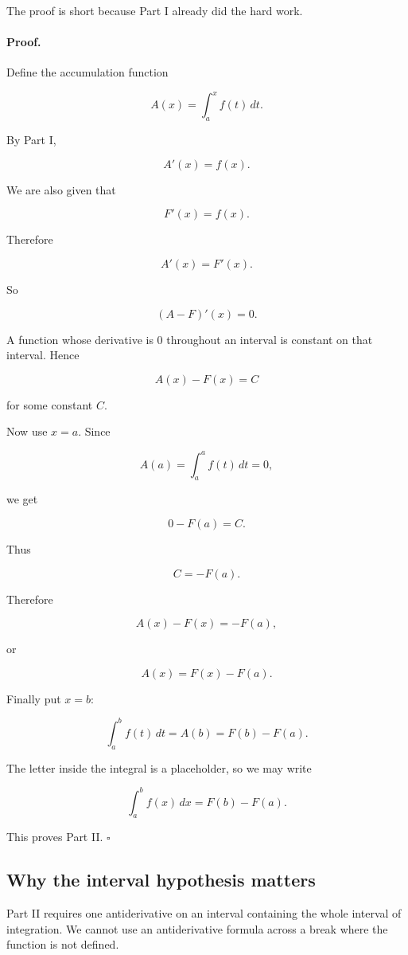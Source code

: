 The proof is short because Part I already did the hard work.

\paragraph{Proof.}
Define the accumulation function

\[
A(x)=\int_a^x f(t)\,dt.
\]

By Part I,

\[
A'(x)=f(x).
\]

We are also given that

\[
F'(x)=f(x).
\]

Therefore

\[
A'(x)=F'(x).
\]

So

\[
(A-F)'(x)=0.
\]

A function whose derivative is \(0\) throughout an interval is constant on that interval.
Hence

\[
A(x)-F(x)=C
\]

for some constant \(C\).

Now use \(x=a\).  Since

\[
A(a)=\int_a^a f(t)\,dt=0,
\]

we get

\[
0-F(a)=C.
\]

Thus

\[
C=-F(a).
\]

Therefore

\[
A(x)-F(x)=-F(a),
\]

or

\[
A(x)=F(x)-F(a).
\]

Finally put \(x=b\):

\[
\int_a^b f(t)\,dt
=
A(b)
=
F(b)-F(a).
\]

The letter inside the integral is a placeholder, so we may write

\[
\int_a^b f(x)\,dx=F(b)-F(a).
\]

This proves Part II. \(\square\)

\subsection{Why the interval hypothesis matters}
\label{subsec:ftc2-interval-hypothesis}

Part II requires one antiderivative on an interval containing the whole interval of
integration.  We cannot use an antiderivative formula across a break where the function
is not defined.

